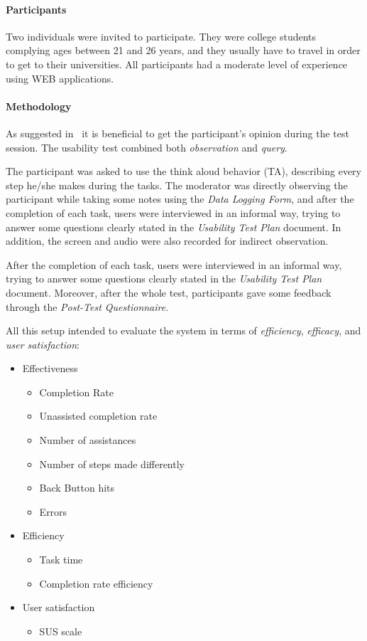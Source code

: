 \documentclass[a4paper]{article}
\begin{document}
\paragraph{Participants} Two individuals were invited to participate. They were college students complying ages between 21 and 26 years, and they usually have to travel in order to get to their universities. All participants had a moderate level of experience using WEB applications.

\paragraph{Methodology} As suggested in~\citep{mitchell2007step} it is beneficial to get the participant's opinion during the test session.
The usability test combined both \emph{observation} and \textit{query}.

The participant was asked to use the think aloud behavior (TA), describing every step he/she makes during the tasks.
The moderator was directly observing the participant while taking some notes using the \emph{Data Logging Form}, and after the completion of each task, users were interviewed in an informal way, trying to answer some questions clearly stated in the \emph{Usability Test Plan} document.
In addition, the screen and audio were also recorded for indirect observation.

 After the completion of each task, users were interviewed in an informal way, trying to answer some questions clearly stated in the \emph{Usability Test Plan} document. Moreover, after the whole test, participants gave some feedback through the \emph{Post-Test Questionnaire}.
 
 All this setup intended to evaluate the system in terms of \emph{efficiency}, \emph{efficacy}, and \emph{user satisfaction}:
 
 \begin{itemize}
   \item Effectiveness
   \begin{itemize}
     \item Completion Rate
     \item Unassisted completion rate
     \item Number of assistances
     \item Number of steps made differently
     \item Back Button hits
     \item Errors
   \end{itemize}
   \item Efficiency
   \begin{itemize}
     \item Task time
     \item Completion rate efficiency
   \end{itemize}
   \item User satisfaction
   \begin{itemize}
     \item SUS scale
   \end{itemize}
 \end{itemize}
\end{document}
